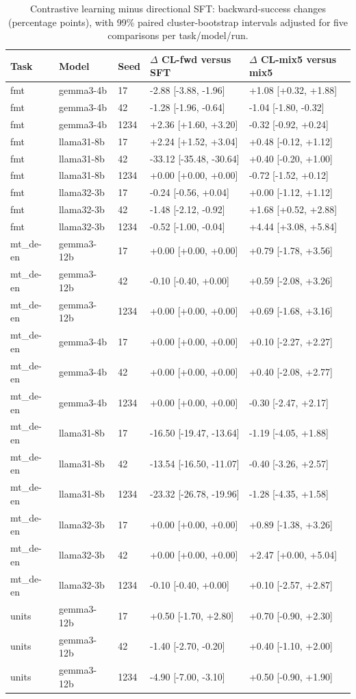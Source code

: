 \begin{table}[t]
\centering\small
\begin{tabular}{lllll}
\toprule
Task & Model & Seed & $\Delta$ CL-fwd versus SFT & $\Delta$ CL-mix5 versus mix5 \\
\midrule
fmt & gemma3-4b & 17 & -2.88 [-3.88, -1.96] & +1.08 [+0.32, +1.88] \\
fmt & gemma3-4b & 42 & -1.28 [-1.96, -0.64] & -1.04 [-1.80, -0.32] \\
fmt & gemma3-4b & 1234 & +2.36 [+1.60, +3.20] & -0.32 [-0.92, +0.24] \\
fmt & llama31-8b & 17 & +2.24 [+1.52, +3.04] & +0.48 [-0.12, +1.12] \\
fmt & llama31-8b & 42 & -33.12 [-35.48, -30.64] & +0.40 [-0.20, +1.00] \\
fmt & llama31-8b & 1234 & +0.00 [+0.00, +0.00] & -0.72 [-1.52, +0.12] \\
fmt & llama32-3b & 17 & -0.24 [-0.56, +0.04] & +0.00 [-1.12, +1.12] \\
fmt & llama32-3b & 42 & -1.48 [-2.12, -0.92] & +1.68 [+0.52, +2.88] \\
fmt & llama32-3b & 1234 & -0.52 [-1.00, -0.04] & +4.44 [+3.08, +5.84] \\
mt\_de-en & gemma3-12b & 17 & +0.00 [+0.00, +0.00] & +0.79 [-1.78, +3.56] \\
mt\_de-en & gemma3-12b & 42 & -0.10 [-0.40, +0.00] & +0.59 [-2.08, +3.26] \\
mt\_de-en & gemma3-12b & 1234 & +0.00 [+0.00, +0.00] & +0.69 [-1.68, +3.16] \\
mt\_de-en & gemma3-4b & 17 & +0.00 [+0.00, +0.00] & +0.10 [-2.27, +2.27] \\
mt\_de-en & gemma3-4b & 42 & +0.00 [+0.00, +0.00] & +0.40 [-2.08, +2.77] \\
mt\_de-en & gemma3-4b & 1234 & +0.00 [+0.00, +0.00] & -0.30 [-2.47, +2.17] \\
mt\_de-en & llama31-8b & 17 & -16.50 [-19.47, -13.64] & -1.19 [-4.05, +1.88] \\
mt\_de-en & llama31-8b & 42 & -13.54 [-16.50, -11.07] & -0.40 [-3.26, +2.57] \\
mt\_de-en & llama31-8b & 1234 & -23.32 [-26.78, -19.96] & -1.28 [-4.35, +1.58] \\
mt\_de-en & llama32-3b & 17 & +0.00 [+0.00, +0.00] & +0.89 [-1.38, +3.26] \\
mt\_de-en & llama32-3b & 42 & +0.00 [+0.00, +0.00] & +2.47 [+0.00, +5.04] \\
mt\_de-en & llama32-3b & 1234 & -0.10 [-0.40, +0.00] & +0.10 [-2.57, +2.87] \\
units & gemma3-12b & 17 & +0.50 [-1.70, +2.80] & +0.70 [-0.90, +2.30] \\
units & gemma3-12b & 42 & -1.40 [-2.70, -0.20] & +0.40 [-1.10, +2.00] \\
units & gemma3-12b & 1234 & -4.90 [-7.00, -3.10] & +0.50 [-0.90, +1.90] \\
\bottomrule
\end{tabular}
\caption{Contrastive learning minus directional SFT: backward-success changes (percentage points), with 99\% paired cluster-bootstrap intervals adjusted for five comparisons per task/model/run.}
\label{tab:contrastive-snapshot}
\end{table}
